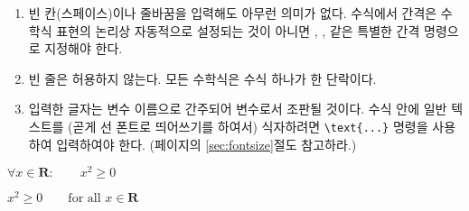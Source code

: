 \begin{enumerate}

\item {} 빈 칸(스페이스)이나 줄바꿈을 입력해도 아무런 의미가 없다.
수식에서 간격은 수학식 표현의 논리상 자동적으로 설정되는 것이 아니면 \ci{,}, ,  같은 
특별한 간격 명령으로 지정해야 한다.

\item 빈 줄은 허용하지 않는다. 모든 수학식은 수식 하나가 한 단락이다.

\item 입력한 글자는 변수 이름으로 간주되어 변수로서 조판될 것이다. 수식 안에 일반 텍스트를 
(곧게 선 폰트로 띄어쓰기를 하여서) 식자하려면 \verb|\text{...}| 명령을 사용하여 입력하여야 한다. (\pageref{sec:fontsize}페이지의 
\ref{sec:fontsize}절도 참고하라.)

\end{enumerate}
\begin{example}
$\forall x \in \mathbf{R}:
 \qquad x^{2} \geq 0$
\end{example}
\vspace{-.5\onelineskip}
\begin{example}
$x^{2} \geq 0\qquad
 \text{for all }x\in\mathbf{R}$
\end{example}


